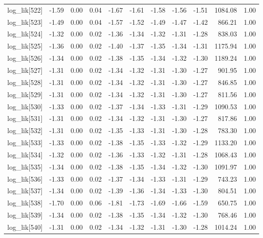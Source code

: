 \begin{table}[ht]
\begin{tabular}{rrrrrrrrrrr}
  log\_lik[522] & -1.59 & 0.00 & 0.04 & -1.67 & -1.61 & -1.58 & -1.56 & -1.51 & 1084.08 & 1.00 \\ 
  log\_lik[523] & -1.49 & 0.00 & 0.04 & -1.57 & -1.52 & -1.49 & -1.47 & -1.42 & 866.21 & 1.00 \\ 
  log\_lik[524] & -1.32 & 0.00 & 0.02 & -1.36 & -1.34 & -1.32 & -1.31 & -1.28 & 838.03 & 1.00 \\ 
  log\_lik[525] & -1.36 & 0.00 & 0.02 & -1.40 & -1.37 & -1.35 & -1.34 & -1.31 & 1175.94 & 1.00 \\ 
  log\_lik[526] & -1.34 & 0.00 & 0.02 & -1.38 & -1.35 & -1.34 & -1.32 & -1.30 & 1189.24 & 1.00 \\ 
  log\_lik[527] & -1.31 & 0.00 & 0.02 & -1.34 & -1.32 & -1.31 & -1.30 & -1.27 & 901.95 & 1.00 \\ 
  log\_lik[528] & -1.31 & 0.00 & 0.02 & -1.34 & -1.32 & -1.31 & -1.30 & -1.27 & 846.85 & 1.00 \\ 
  log\_lik[529] & -1.31 & 0.00 & 0.02 & -1.34 & -1.32 & -1.31 & -1.30 & -1.27 & 811.56 & 1.00 \\ 
  log\_lik[530] & -1.33 & 0.00 & 0.02 & -1.37 & -1.34 & -1.33 & -1.31 & -1.29 & 1090.53 & 1.00 \\ 
  log\_lik[531] & -1.31 & 0.00 & 0.02 & -1.34 & -1.32 & -1.31 & -1.30 & -1.27 & 817.86 & 1.00 \\ 
  log\_lik[532] & -1.31 & 0.00 & 0.02 & -1.35 & -1.33 & -1.31 & -1.30 & -1.28 & 783.30 & 1.00 \\ 
  log\_lik[533] & -1.33 & 0.00 & 0.02 & -1.38 & -1.35 & -1.33 & -1.32 & -1.29 & 1133.20 & 1.00 \\ 
  log\_lik[534] & -1.32 & 0.00 & 0.02 & -1.36 & -1.33 & -1.32 & -1.31 & -1.28 & 1068.43 & 1.00 \\ 
  log\_lik[535] & -1.34 & 0.00 & 0.02 & -1.38 & -1.35 & -1.34 & -1.32 & -1.30 & 1091.97 & 1.00 \\ 
  log\_lik[536] & -1.33 & 0.00 & 0.02 & -1.37 & -1.34 & -1.33 & -1.31 & -1.29 & 743.23 & 1.00 \\ 
  log\_lik[537] & -1.34 & 0.00 & 0.02 & -1.39 & -1.36 & -1.34 & -1.33 & -1.30 & 804.51 & 1.00 \\ 
  log\_lik[538] & -1.70 & 0.00 & 0.06 & -1.81 & -1.73 & -1.69 & -1.66 & -1.59 & 650.75 & 1.00 \\ 
  log\_lik[539] & -1.34 & 0.00 & 0.02 & -1.38 & -1.35 & -1.34 & -1.32 & -1.30 & 768.46 & 1.00 \\ 
  log\_lik[540] & -1.31 & 0.00 & 0.02 & -1.34 & -1.32 & -1.31 & -1.30 & -1.28 & 1014.24 & 1.00 \\ 

\end{tabular}
\end{table}
